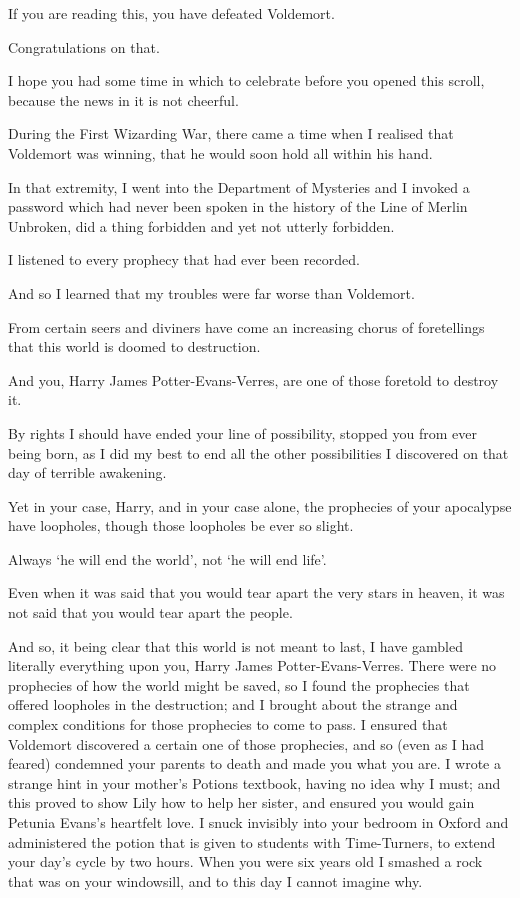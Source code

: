 \begin{writtenNote}

If you are reading this, you have defeated Voldemort.

Congratulations on that.

I hope you had some time in which to celebrate before you opened this
scroll, because the news in it is not cheerful.

During the First Wizarding War, there came a time when I realised that
Voldemort was winning, that he would soon hold all within his hand.

In that extremity, I went into the Department of Mysteries and I invoked
a password which had never been spoken in the history of the Line of Merlin
Unbroken, did a thing forbidden and yet not utterly forbidden.

I listened to every prophecy that had ever been recorded.

And so I learned that my troubles were far worse than Voldemort.

From certain seers and diviners have come an increasing chorus of
foretellings that this world is doomed to destruction.

And you, Harry James Potter-Evans-Verres, are one of those foretold to
destroy it.

By rights I should have ended your line of possibility, stopped you from
ever being born, as I did my best to end all the other possibilities I
discovered on that day of terrible awakening.

Yet in your case, Harry, and in your case alone, the prophecies of your
apocalypse have loopholes, though those loopholes be ever so slight.

Always `he will end the world', not `he will end life'.

Even when it was said that you would tear apart the very stars in heaven,
it was not said that you would tear apart the people.

And so, it being clear that this world is not meant to last, I have
gambled literally everything upon you, Harry James Potter-Evans-Verres. There
were no prophecies of how the world might be saved, so I found the prophecies
that offered loopholes in the destruction; and I brought about the strange and
complex conditions for those prophecies to come to pass. I ensured that
Voldemort discovered a certain one of those prophecies, and so (even as I had
feared) condemned your parents to death and made you what you are. I wrote a
strange hint in your mother's Potions textbook, having no idea why I must; and
this proved to show Lily how to help her sister, and ensured you would gain
Petunia Evans's heartfelt love. I snuck invisibly into your bedroom in Oxford
and administered the potion that is given to students with Time-Turners, to
extend your day's cycle by two hours. When you were six years old I smashed a
rock that was on your windowsill, and to this day I cannot imagine why.


\end{writtenNote}
